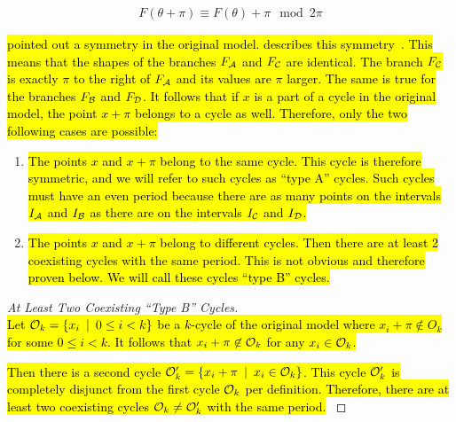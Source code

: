 \begin{align}
	F(\theta + \pi) \equiv F(\theta) + \pi \mod 2\pi \label{equ:state.og.sym}
\end{align}

\hl{
	 pointed out a symmetry in the original model.
	 describes this symmetry~\cite{akyuz2022}.
	This means that the shapes of the branches $F_{\mathcal{A}}$ and $F_{\mathcal{C}}$ are identical.
	The branch $F_{\mathcal{C}}$ is exactly $\pi$ to the right of $F_{\mathcal{A}}$ and its values are $\pi$ larger.
	The same is true for the branches $F_{\mathcal{B}}$ and $F_{\mathcal{D}}$.
	It follows that if $x$ is a part of a cycle in the original model, the point $x + \pi$ belongs to a cycle as well.
	Therefore, only the two following cases are possible:
}

\begin{enumerate}[label=(\Alph*)]
	\item
	      \hl{
		      The points $x$ and $x + \pi$ belong to the same cycle.
		      This cycle is therefore symmetric, and we will refer to such cycles as ``type A'' cycles.
		      Such cycles must have an even period because there are as many points on the intervals $I_{\mathcal{A}}$ and $I_{\mathcal{B}}$ as there are on the intervals $I_{\mathcal{C}}$ and $I_{\mathcal{D}}$.
	      }
	\item
	      \hl{
		      The points $x$ and $x + \pi$ belong to different cycles.
		      Then there are at least 2 coexisting cycles with the same period.
		      This is not obvious and therefore proven below. %
		      We will call these cycles ``type B'' cycles.
	      }
\end{enumerate}

\begin{proof}[At Least Two Coexisting ``Type B'' Cycles] \phantom{x} \\
	\hl{
		Let $\mathcal{O}_k = \left\{x_i \:\mid\: 0 \leq i < k\right\}$ be a $k$-cycle of the original model where $x_i + \pi \not\in O_k$ for some $0 \leq i < k$.
		It follows that $x_i + \pi \not\in \mathcal{O}_k$ for any $x_i \in \mathcal{O}_k$.
	}

	\hl{
		Then there is a second cycle $\mathcal{O}'_k = \left\{x_i + \pi \:\mid\: x_i \in \mathcal{O}_k\right\}$.
		This cycle $\mathcal{O}'_k$ is completely disjunct from the first cycle $\mathcal{O}_k$ per definition.
		Therefore, there are at least two coexisting cycles $\mathcal{O}_k \neq \mathcal{O}'_k$ with the same period.
	}
	\label{proof:state.cycle.B.coex}
\end{proof}

